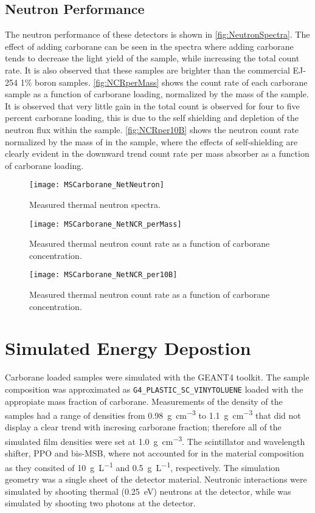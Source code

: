 \documentclass[draftcls,onecolumn]{IEEEtran}
\begin{document}
\subsection{Neutron Performance}
The neutron performance of these detectors is shown in \autoref{fig:NeutronSpectra}.
The effect of adding carborane can be seen in the spectra where adding carborane tends to decrease the light yield of the sample, while increasing the total count rate.
It is also observed that these samples are brighter than the commercial EJ-254 1\% boron samples.
\autoref{fig:NCRperMass} shows the count rate of each carborane sample as a function of carborane loading, normalized by the mass of the sample. 
It is observed that very little gain in the total count is observed for four to five percent carborane loading, this is due to the self shielding and depletion of the neutron flux within the sample.
\autoref{fig:NCRper10B} shows the neutron count rate normalized by the mass of  in the sample, where the effects of self-shielding are clearly evident in the downward trend count rate per mass absorber as a function of carborane loading.
\begin{figure}
  \centering
  \texttt{[image: MSCarborane\_NetNeutron]}
  \caption[Measured Thermal Neutron Count Rate]{Measured thermal neutron spectra.}
  \label{fig:NeutronSpectra}
\end{figure}
\begin{figure}
  \centering
  \texttt{[image: MSCarborane\_NetNCR\_perMass]}
  \caption[Measured Thermal Neutron Count Rate]{Measured thermal neutron count rate as a function of carborane concentration. }
  \label{fig:NCRperMass}
\end{figure}
\begin{figure}
  \centering
  \texttt{[image: MSCarborane\_NetNCR\_per10B]}
  \caption[Measured Thermal Neutron Count Rate]{Measured thermal neutron count rate as a function of carborane concentration. }
  \label{fig:NCRper10B}
\end{figure}
\section{Simulated Energy Depostion}
Carborane loaded samples were simulated with the GEANT4 toolkit.
The sample composition was approximated as \verb+G4_PLASTIC_SC_VINYTOLUENE+ loaded with the appropiate mass fraction of carborane.
Measurements of the density of the samples had a range of densities from \SI{0.98}{\gram\per\cm\cubed} to \SI{1.1}{\gram\per\cm\cubed} that did not display a clear trend with incresing carborane fraction; therefore all of the simulated film densities were set at \SI{1.0}{\gram\per\cm\cubed}.
The scintillator and wavelength shifter, PPO and bis-MSB, where not accounted for in the material composition as they consited of \SI{10}{\gram\per\liter} and  \SI{0.5}{\gram\per\liter}, respectively.
The simulation geometry was a single sheet of the detector material.
Neutronic interactions were simulated by shooting thermal (\SI{0.25}{\eV}) neutrons at the detector, while  was simulated by shooting two photons at the detector.
\end{document}
